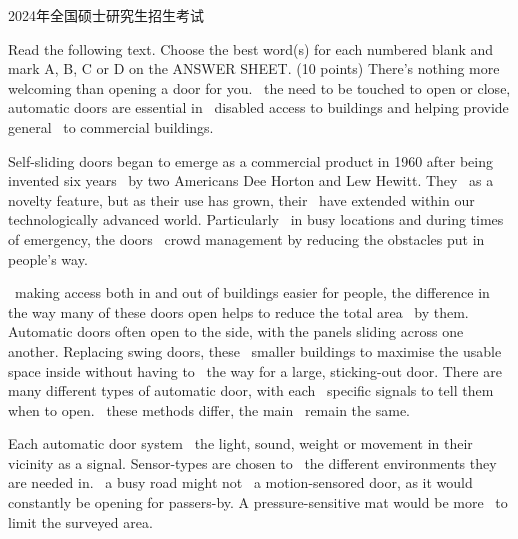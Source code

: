\documentclass[12pt,a4paper]{article}
\begin{document}
\begin{coverpage}{2024年全国硕士研究生招生考试}
\end{coverpage}

\begin{cloze}{
  Read the following text. Choose the best word(s) for each numbered blank and mark A, B, C or D on the ANSWER SHEET. (10 points)
}
There's nothing more welcoming than opening a door for you. \blank\ the need to be touched to open or close, automatic doors are essential in \blank\ disabled access to buildings and helping provide general \blank\ to commercial buildings.

Self-sliding doors began to emerge as a commercial product in 1960 after being invented six years \blank\ by two Americans Dee Horton and Lew Hewitt. They \blank\ as a novelty feature, but as their use has grown, their \blank\ have extended within our technologically advanced world. Particularly \blank\ in busy locations and during times of emergency, the doors \blank\ crowd management by reducing the obstacles put in people's way.

\blank\ making access both in and out of buildings easier for people, the difference in the way many of these doors open helps to reduce the total area \blank\ by them. Automatic doors often open to the side, with the panels sliding across one another. Replacing swing doors, these \blank\ smaller buildings to maximise the usable space inside without having to \blank\ the way for a large, sticking-out door. There are many different types of automatic door, with each \blank\ specific signals to tell them when to open. \blank\ these methods differ, the main \blank\ remain the same.

Each automatic door system \blank\ the light, sound, weight or movement in their vicinity as a signal. Sensor-types are chosen to \blank\ the different environments they are needed in. \blank\ a busy road might not \blank\ a motion-sensored door, as it would constantly be opening for passers-by. A pressure-sensitive mat would be more \blank\ to limit the surveyed area.
\end{cloze}
\end{document}
